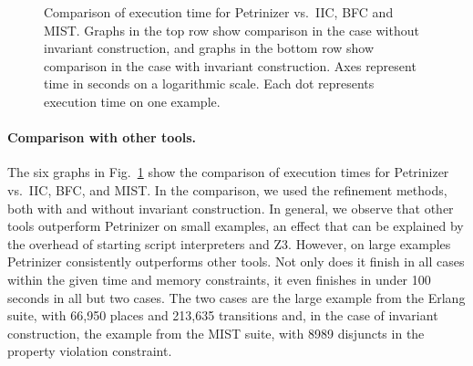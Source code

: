\begin{figure}[t]
  \centering 
  \caption[Comparison of execution time for Petrinizer vs.~IIC,
  BFC and MIST.\@]{Comparison of execution time for Petrinizer vs.~IIC,
  BFC and MIST\@. Graphs in the top row show comparison in the case without
  invariant construction, and graphs in the bottom row show comparison in
  the case with invariant construction. Axes represent time in seconds on a
  logarithmic scale. Each dot represents execution time on one example.}
\label{fig:performance-vs-tools}
\end{figure}

\paragraph{Comparison with other tools.} The six graphs in
Fig.~\ref{fig:performance-vs-tools} show the comparison of execution times 
for Petrinizer vs.~IIC, BFC, and MIST\@. 
In the comparison, we used
the refinement methods, both with and without invariant construction.
In general, we observe that other tools outperform
Petrinizer on small examples, an effect that can be explained by the
overhead of starting script interpreters and Z3. 
However, on large examples Petrinizer consistently outperforms other tools.
Not only does it finish in all cases within the given time and memory
constraints, it even finishes in under 100
seconds in all but two cases. The two cases are the
large example from the Erlang suite, with 66,950 places and 213,635
transitions and, in the case of invariant construction, the example
from the MIST suite, with 8989 disjuncts in the property violation constraint.












